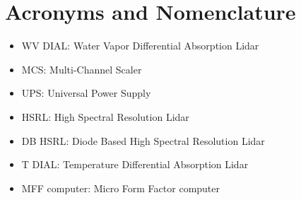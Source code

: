 
\chapter{Acronyms and Nomenclature}
\label{CH-Acronyms}

\begin{itemize}
\item{WV DIAL: Water Vapor Differential Absorption Lidar}
\item{MCS: Multi-Channel Scaler}
\item{UPS: Universal Power Supply}
\item{HSRL: High Spectral Resolution Lidar}
\item{DB HSRL: Diode Based High Spectral Resolution Lidar}
\item{T DIAL: Temperature Differential Absorption Lidar}
\item{MFF computer: Micro Form Factor computer}
\end{itemize}
\newpage    
